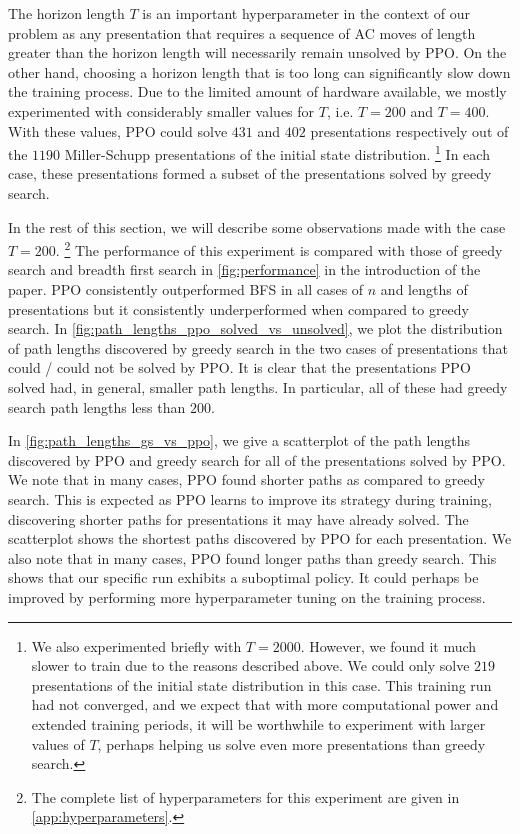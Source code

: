 The horizon length $T$ is an important hyperparameter in the context of our problem as any presentation that requires a sequence of AC moves of length greater than the horizon length will necessarily remain unsolved by PPO. On the other hand, choosing a horizon length that is too long can significantly slow down the training process. Due to the limited amount of hardware available, we mostly experimented with considerably smaller values for $T$, i.e. $T=200$ and $T=400$.  With these values, PPO could solve $431$ and $402$ presentations respectively out of the $1190$ Miller-Schupp presentations of the initial state distribution.
\footnote{
We also experimented briefly with $T=2000$. However, we found it much slower to train due to the reasons described above. We could only solve $219$ presentations of the initial state distribution in this case. This training run had not converged, and we expect that with more computational power and extended training periods, it will be worthwhile to experiment with larger values of $T$, perhaps helping us solve even more presentations than greedy search.
}
In each case, these presentations formed a subset of the presentations solved by greedy search.  
\newline 

In the rest of this section, we will describe some observations made with the case $T=200$.
\footnote{
The complete list of hyperparameters for this experiment are given in \autoref{app:hyperparameters}. 
} The performance of this experiment is compared with those of greedy search and breadth first search in \autoref{fig:performance} in the introduction of the paper. PPO consistently outperformed BFS in all cases of $n$ and lengths of presentations but it consistently underperformed when compared to greedy search. In \autoref{fig:path_lengths_ppo_solved_vs_unsolved}, we plot the distribution of path lengths discovered by greedy search in the two cases of presentations that could / could not be solved by PPO. It is clear that the presentations PPO solved had, in general, smaller path lengths. In particular, all of these had greedy search path lengths less than $200$. 
\newline 

In \autoref{fig:path_lengths_gs_vs_ppo}, we give a scatterplot of the path lengths discovered by PPO and greedy search for all of the presentations solved by PPO. We note that in many cases, PPO found shorter paths as compared to greedy search. This is expected as PPO learns to improve its strategy during training, discovering shorter paths for presentations it may have already solved. The scatterplot shows the shortest paths discovered by PPO for each presentation. We also note that in many cases, PPO found longer paths than greedy search. This shows that our specific run exhibits a suboptimal policy. It could perhaps be improved by performing more hyperparameter tuning on the training process. 

